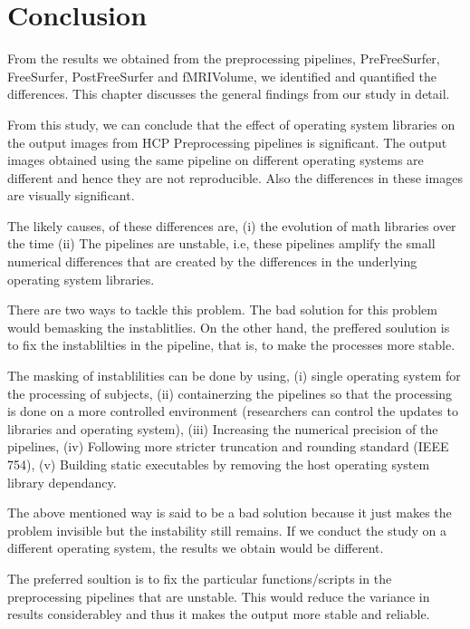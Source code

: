 \chapter{Conclusion}
From the results we obtained from the preprocessing pipelines, PreFreeSurfer, FreeSurfer, PostFreeSurfer and fMRIVolume, we identified and quantified the differences. This chapter discusses the general findings from our study in detail.

From this study, we can conclude that the effect of operating system libraries on the output images from HCP Preprocessing pipelines is significant. The output images obtained using the same pipeline on different operating systems are different and hence they are not reproducible. Also the differences in these images are visually significant.

The likely causes, of these differences are, (i) the evolution of math libraries over the time (ii) The pipelines are unstable, i.e, these pipelines amplify the small numerical differences that are created by the differences in the underlying operating system libraries.

There are two ways to tackle this problem. The bad solution for this problem would bemasking the instablitlies. On the other hand, the preffered soulution is to fix the instablilties in the pipeline, that is, to make the processes more stable.

The masking of instablilities can be done by using, (i) single operating system for the processing of subjects, (ii) containerzing the pipelines so that the processing is done on a more controlled environment (researchers can control the updates to libraries and operating system), (iii) Increasing the numerical precision of the pipelines, (iv) Following more stricter truncation and rounding standard (IEEE 754), (v) Building static executables by removing the host operating system library dependancy.

The above mentioned way is said to be a bad solution because it just makes the problem invisible but the instability still remains. If we conduct the study on a different operating system, the results we obtain would be different.

The preferred soultion is to fix the particular functions/scripts in the preprocessing pipelines that are unstable. This would reduce the variance in results considerabley and thus it makes the output more stable and reliable.



